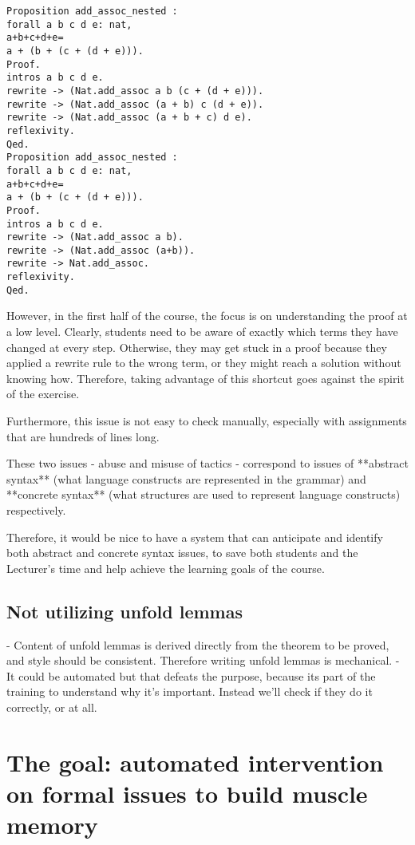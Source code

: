 \begin{lstlisting}
Proposition add_assoc_nested :
forall a b c d e: nat,
a+b+c+d+e=
a + (b + (c + (d + e))).
Proof.
intros a b c d e.
rewrite -> (Nat.add_assoc a b (c + (d + e))).
rewrite -> (Nat.add_assoc (a + b) c (d + e)).
rewrite -> (Nat.add_assoc (a + b + c) d e).
reflexivity.
Qed.
Proposition add_assoc_nested :
forall a b c d e: nat,
a+b+c+d+e=
a + (b + (c + (d + e))).
Proof.
intros a b c d e.
rewrite -> (Nat.add_assoc a b).
rewrite -> (Nat.add_assoc (a+b)).
rewrite -> Nat.add_assoc.
reflexivity.
Qed.
\end{lstlisting}

However, in the first half of the course, the focus is on understanding the proof at a low level. Clearly, students need to be aware of exactly which terms they have changed at every step. Otherwise, they may get stuck in a proof because they applied a rewrite rule to the wrong term, or they might reach a solution without knowing how. Therefore, taking advantage of this shortcut goes against the spirit of the exercise.

Furthermore, this issue is not easy to check manually, especially with assignments that are hundreds of lines long.

These two issues - abuse and misuse of tactics - correspond to issues of **abstract syntax** (what language constructs are represented in the grammar) and **concrete syntax** (what structures are used to represent language constructs) respectively.

Therefore, it would be nice to have a system that can anticipate and identify both abstract and concrete syntax issues, to save both students and the Lecturer’s time and help achieve the learning goals of the course.

\subsection{Not utilizing unfold lemmas}

- Content of unfold lemmas is derived directly from the theorem to be proved, and style should be consistent. Therefore writing unfold lemmas is mechanical.
- It could be automated but that defeats the purpose, because its part of the training to understand why it's important. Instead we'll check if they do it correctly, or at all.

\section{The goal: automated intervention on formal issues to build muscle memory}

